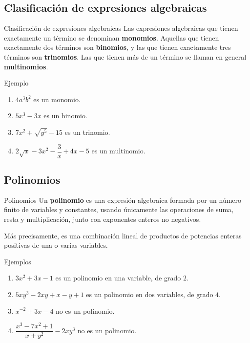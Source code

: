 \documentclass[10pt,handout,aspectratio=169]{beamer}
\begin{document}
	\subsection{Clasificación de expresiones algebraicas}
	
	\begin{frame}{Clasificación de expresiones algebraicas}
		Las expresiones algebraicas que tienen exactamente un término se denominan \textbf{monomios}. Aquellas que tienen exactamente dos términos son \textbf{binomios}, y las que tienen exactamente tres términos son \textbf{trinomios}. Las que tienen más de un término se llaman en general \textbf{multinomios}.
		
		\begin{block}{Ejemplo}
			\begin{enumerate}
				\item $4a^{3}b^{2}$ es un monomio.
				\item $5x^{3}-3x$ es un binomio.
				\item $7x^{2}+\sqrt{y^{5}}-15$ es un trinomio.
				\item $2\sqrt{x}-3x^{2}-\dfrac{3}{x}+4x-5$ es un multinomio.
			\end{enumerate}
		\end{block}
	\end{frame}
	
	\subsection{Polinomios}
	
	\begin{frame}{Polinomios}
		\justifying
		Un \textbf{polinomio} es una expresión algebraica formada por un número finito de variables y constantes, usando únicamente las operaciones de suma, resta y multiplicación, junto con exponentes enteros no negativos.
		
		\bigskip
		
		Más precisamente, es una combinación lineal de productos de potencias enteras positivas de una o varias variables.
		
		\begin{block}{Ejemplos}
			\begin{enumerate}
				\item $3x^{2}+3x-1$ es un polinomio en una variable, de grado $2$.
				\item $5xy^{3}-2xy+x-y+1$ es un polinomio en dos variables, de grado $4$.
				\item $x^{-2}+3x-4$ no es un polinomio.
				\item $\dfrac{x^{3}-7x^{2}+1}{x+y^{2}}-2xy^{3}$ no es un polinomio.
			\end{enumerate}
		\end{block}
	\end{frame}
	
\end{document}
